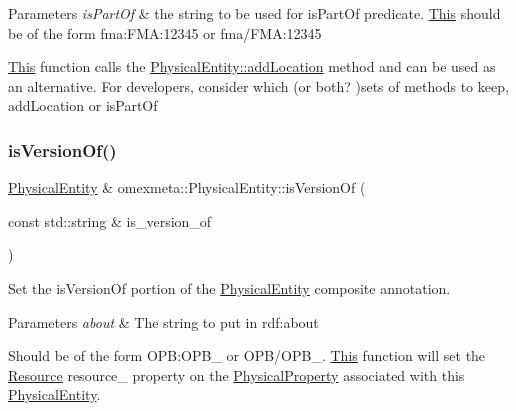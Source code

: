 \begin{DoxyParams}{Parameters}
{\em is\+Part\+Of} & the string to be used for is\+Part\+Of predicate. \hyperlink{classThis}{This} should be of the form fma\+:\+F\+MA\+:12345 or fma/\+F\+MA\+:12345\\
\hline
\end{DoxyParams}
\hyperlink{classThis}{This} function calls the {\ttfamily \hyperlink{classomexmeta_1_1PhysicalEntity_a82e77be3327c537b2426b571afaa5045}{Physical\+Entity\+::add\+Location}} method and can be used as an alternative. For developers, consider which (or both? )sets of methods to keep, {\ttfamily add\+Location} or {\ttfamily is\+Part\+Of} \mbox{\label{classomexmeta_1_1PhysicalEntity_a5399ef8eef084f2dd8b13ef537823d94}} 
\subsubsection{\texorpdfstring{is\+Version\+Of()}{isVersionOf()}}
{\footnotesize\ttfamily \hyperlink{classomexmeta_1_1PhysicalEntity}{Physical\+Entity} \& omexmeta\+::\+Physical\+Entity\+::is\+Version\+Of (\begin{DoxyParamCaption}\item[{const std\+::string \&}]{is\+\_\+version\+\_\+of }\end{DoxyParamCaption})}



Set the is\+Version\+Of portion of the \hyperlink{classomexmeta_1_1PhysicalEntity}{Physical\+Entity} composite annotation. 


\begin{DoxyParams}{Parameters}
{\em about} & The string to put in rdf\+:about\\
\hline
\end{DoxyParams}
Should be of the form O\+PB\+:O\+P\+B\+\_ or O\+P\+B/\+O\+P\+B\+\_. \hyperlink{classThis}{This} function will set the \hyperlink{classomexmeta_1_1Resource}{Resource} resource\+\_\+ property on the \hyperlink{classomexmeta_1_1PhysicalProperty}{Physical\+Property} associated with this \hyperlink{classomexmeta_1_1PhysicalEntity}{Physical\+Entity}. \mbox{\label{classomexmeta_1_1PhysicalEntity_a1736d331705bf2f1569f492fc733949e}} 
